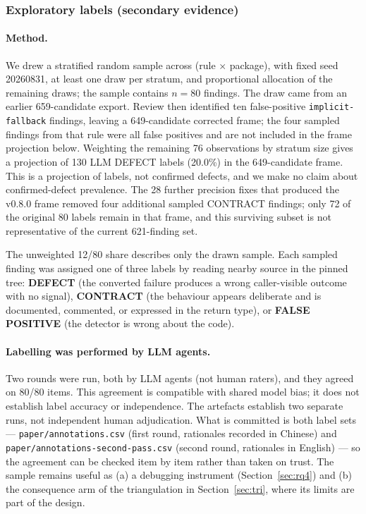 \documentclass[10pt,a4paper]{article}
\begin{document}
\subsubsection{Exploratory labels (secondary evidence)}
\label{sec:rq2}

\paragraph{Method.}
We drew a stratified random sample across (rule $\times$ package), with fixed
seed 20260831, at least one draw per stratum, and proportional allocation of the
remaining draws; the sample contains $n=80$ findings. The draw came from an
earlier 659-candidate export. Review then identified ten false-positive
\texttt{implicit-fallback} findings, leaving a 649-candidate corrected frame;
the four sampled findings from that rule were all false positives and are not
included in the frame projection below. Weighting the remaining 76 observations
by stratum size gives a projection of 130 LLM DEFECT labels (20.0\%) in the
649-candidate frame. This is a projection of labels, not confirmed defects, and
we make no claim about confirmed-defect prevalence. The 28 further precision fixes that produced
the v0.8.0 frame removed four additional sampled CONTRACT findings; only 72 of
the original 80 labels remain in that frame, and this surviving subset is not
representative of the current 621-finding set.

The unweighted 12/80 share describes only the drawn sample. Each sampled finding
was assigned one of three labels by reading nearby source in the pinned tree:
\textbf{DEFECT} (the converted failure produces a wrong caller-visible outcome
with no signal), \textbf{CONTRACT} (the behaviour appears deliberate and is
documented, commented, or expressed in the return type), or \textbf{FALSE
POSITIVE} (the detector is wrong about the code).

\paragraph{Labelling was performed by LLM agents.}
Two rounds were run, both by LLM agents (not human raters), and they agreed on
80/80 items. This agreement is compatible with shared model bias; it does not
establish label accuracy or independence. The artefacts establish two separate
runs, not independent human adjudication. What
is committed is both label sets --- \texttt{paper/annotations.csv} (first round,
rationales recorded in Chinese) and
\texttt{paper/annotations-second-pass.csv} (second round, rationales in English)
--- so the agreement can be checked item by item rather than taken on trust. The
sample remains useful as (a) a debugging instrument (Section~\ref{sec:rq4}) and
(b) the consequence arm of the triangulation in Section~\ref{sec:tri}, where its
limits are part of the design.
\end{document}

